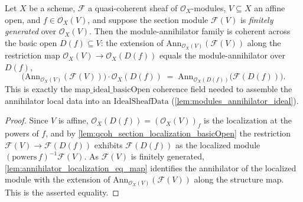 \begin{lemma}
  \label{lem:annihilator_map_basicOpen}
  Let \(X\) be a scheme, \(\mathcal{F}\) a quasi-coherent sheaf of \(\mathcal{O}_X\)-modules,
  \(V \subseteq X\) an affine open, and \(f \in \mathcal{O}_X(V)\), and suppose the section
  module \(\mathcal{F}(V)\) is \emph{finitely generated} over \(\mathcal{O}_X(V)\). Then the
  module-annihilator family is coherent across the basic open \(D(f) \subseteq V\): the
  extension of \(\mathrm{Ann}_{\mathcal{O}_X(V)}(\mathcal{F}(V))\) along the restriction map
  \(\mathcal{O}_X(V) \to \mathcal{O}_X(D(f))\) equals the module-annihilator over \(D(f)\),
  \[
    \bigl(\mathrm{Ann}_{\mathcal{O}_X(V)}(\mathcal{F}(V))\bigr)\cdot \mathcal{O}_X(D(f))
    \;=\; \mathrm{Ann}_{\mathcal{O}_X(D(f))}\bigl(\mathcal{F}(D(f))\bigr).
  \]
  This is exactly the \(\mathrm{map\_ideal\_basicOpen}\) coherence field needed to assemble the
  annihilator local data into an \(\mathrm{IdealSheafData}\) (\cref{lem:modules_annihilator_ideal}).
\end{lemma}
\begin{proof}
  Since \(V\) is affine, \(\mathcal{O}_X(D(f)) = (\mathcal{O}_X(V))_f\) is the localization at the
  powers of \(f\), and by \cref{lem:qcoh_section_localization_basicOpen} the restriction
  \(\mathcal{F}(V) \to \mathcal{F}(D(f))\) exhibits \(\mathcal{F}(D(f))\) as the localized module
  \((\mathrm{powers}\,f)^{-1}\mathcal{F}(V)\). As \(\mathcal{F}(V)\) is finitely generated,
  \cref{lem:annihilator_localization_eq_map} identifies the annihilator of the localized module with
  the extension of \(\mathrm{Ann}_{\mathcal{O}_X(V)}(\mathcal{F}(V))\) along the structure map. This is
  the asserted equality.
\end{proof}

